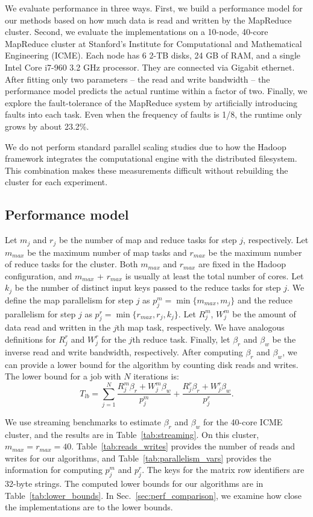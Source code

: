 \documentclass[10pt, conference, compsocconf]{IEEEtran}
\newcommand{\ssum}[3]{\displaystyle\sum\limits_{#1}^{#2} #3}
\begin{document}
We evaluate performance in three ways.  First, we build a performance model for our methods based on how much data is read and written by the MapReduce cluster.  Second, we evaluate the implementations on a 10-node, 40-core MapReduce cluster at Stanford's Institute for Computational and Mathematical Engineering (ICME).  Each node has 6 2-TB disks, 24 GB of RAM, and a single Intel Core i7-960 3.2 GHz processor.  They are connected via Gigabit ethernet.  After fitting only two parameters -- the read and write bandwidth -- the performance model predicts the actual runtime within a factor of two.  Finally, we explore the fault-tolerance of the MapReduce system by artificially introducing faults into each task.  Even when the frequency of faults is 1/8, the runtime only grows by about 23.2\%.

We do not perform standard parallel scaling studies due to how the Hadoop framework integrates the computational engine with the distributed filesystem. This combination makes these measurements difficult without rebuilding the cluster for each experiment.

\subsection{Performance model}\label{sec:perf_model}

Let $m_j$ and $r_j$ be the number of map and reduce tasks for step $j$, respectively.  Let $m_{max}$ be the maximum number of map tasks and $r_{max}$ be the maximum number of reduce tasks for the cluster.  Both $m_{max}$ and $r_{max}$ are fixed in the Hadoop configuration, and $m_{max}$ + $r_{max}$ is usually at least the total number of cores.  Let $k_j$ be the number of distinct input keys passed to the reduce tasks for step $j$.  We define the map parallelism for step $j$ as $p^m_j = \min\{m_{max}, m_j\}$ and the reduce parallelism for step $j$ as $p^r_j = \min\{r_{max}, r_j, k_j\}$.  Let $R^m_j$, $W^m_j$ be the amount of data read and written in the $j$th map task, respectively.  
We have analogous definitions for $R^r_j$ and $W^r_j$ for the $j$th reduce task.  Finally, let $\beta_r$ and $\beta_w$ be the inverse read and write bandwidth, respectively.  After computing $\beta_r$ and $\beta_w$, we can provide a lower bound for the algorithm by counting disk reads and writes.  The lower bound for a job with $N$ iterations is:
\[
T_{lb} = \ssum{j=1}{N}{\frac{R^m_j\beta_r + W^m_j\beta_w}{p^m_j} + \frac{R^r_j\beta_r + W^r_j\beta_w}{p^r_j}}.
\]

We use streaming benchmarks to estimate $\beta_r$ and $\beta_w$ for the 40-core ICME cluster, and the results are in Table~\ref{tab:streaming}.    On this cluster, $m_{max} = r_{max} = 40$.  Table~\ref{tab:reads_writes} provides the number of reads and writes for our algorithms, and Table~\ref{tab:parallelism_vars} provides the information for computing $p_j^m$ and $p_j^r$.  The keys for the matrix row identifiers are 32-byte strings.  The computed lower bounds for our algorithms are in Table~\ref{tab:lower_bounds}.  In Sec.~\ref{sec:perf_comparison}, we examine how close the implementations are to the lower bounds. 
\end{document}
